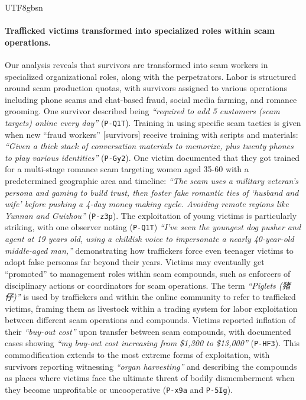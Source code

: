 \documentclass[sigconf,nonacm]{acmart}
\newcommand{\rev}[1]{#1}
\begin{document}
\begin{CJK}{UTF8}{gbsn}
\paragraph{\textbf{Trafficked victims transformed into specialized roles within scam operations.}} Our analysis reveals that survivors are transformed into scam workers in specialized organizational roles, along with the perpetrators. Labor is structured around scam production quotas, with survivors assigned to various operations including phone scams and chat-based fraud, social media farming, and romance grooming. One survivor described being \textit{``required to add 5 customers (scam targets) online every day''} (\texttt{P-Q1T}). Training in using specific scam tactics is given when new ``fraud workers'' [survivors] receive training with scripts and materials: \textit{``Given a thick stack of conversation materials to memorize, plus twenty phones to play various identities''} (\texttt{P-Gy2}). One victim documented that they got trained for a multi-stage romance scam targeting women aged 35-60 with a predetermined geographic area and timeline: \textit{``The scam uses a military veteran's persona and gaming to build trust, then foster fake romantic ties of `husband and wife' before pushing a 4-day money making cycle. Avoiding remote regions like Yunnan and Guizhou''} (\texttt{P-z3p}). The exploitation of young victims is particularly striking, with one observer noting (\texttt{P-Q1T}) \textit{``I've seen the youngest dog pusher and agent at 19 years old, using a childish voice to impersonate a nearly 40-year-old middle-aged man,''} demonstrating how traffickers force even teenager victims to adopt false personas far beyond their years. \rev{Victims may eventually get ``promoted'' to management roles within scam compounds, such as enforcers of disciplinary actions or coordinators for scam operations. The term \textit{``Piglets (猪仔)''} is used by traffickers and within the online community to refer to trafficked victims, framing them as} livestock within a trading system for labor exploitation between different scam operations and compounds. Victims reported inflation of their \textit{``buy-out cost''} upon transfer between scam compounds, with documented cases showing \textit{``my buy-out cost increasing from \$1,300 to \$13,000''} (\texttt{P-HF3}). This commodification extends to the most extreme forms of exploitation, with survivors reporting witnessing \textit{``organ harvesting''} and describing the compounds as places where victims face the ultimate threat of bodily dismemberment when they become unprofitable or uncooperative (\texttt{P-x9a} and \texttt{P-5Ig}).


\end{CJK}
\end{document}
